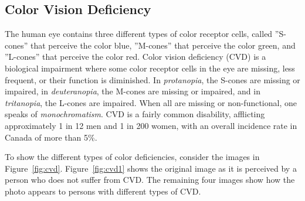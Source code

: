 \subsection*{Color Vision Deficiency}

The human eye contains three different types of color receptor cells, called ''S-cones'' that perceive the color blue, ''M-cones'' that perceive the color green, and ''L-cones'' that perceive the color red. Color vision deficiency (CVD) is a biological impairment where some color receptor cells in the eye are missing, less frequent, or their function is diminished. In \emph{protanopia}, the S-cones are missing or impaired, in \emph{deuteranopia}, the M-cones are missing or impaired, and in \emph{tritanopia}, the L-cones are impaired. When all are missing or non-functional, one speaks of \emph{monochromatism}. CVD is a fairly common disability, afflicting approximately 1 in 12 men and 1 in 200 women, with an overall incidence rate in Canada of more than 5\%.

To show the different types of color deficiencies, consider the images in Figure~\ref{fig:cvd}. Figure~\ref{fig:cvd1} shows the original image as it is perceived by a person who does not suffer from CVD. The remaining four images show how the photo appears to persons with different types of CVD.

